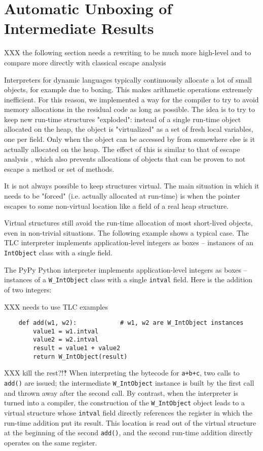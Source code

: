 \section{Automatic Unboxing of Intermediate Results}
\label{sec:virtuals}

XXX the following section needs a rewriting to be much more high-level and to
compare more directly with classical escape analysis

Interpreters for dynamic languages typically continuously allocate a lot of small
objects, for example due to boxing. This makes arithmetic operations extremely
inefficient. For this reason, we
implemented a way for the compiler to try to avoid memory allocations in the
residual code as long as possible. The idea is to try to keep new
run-time structures "exploded": instead of a single run-time object allocated on
the heap, the object is "virtualized" as a set
of fresh local variables, one per field. Only when the object can be accessed by from
somewhere else is it actually allocated on the heap. The effect of this is similar to that of
escape analysis \cite{XXX}, which also prevents allocations of objects that can
be proven to not escape a method or set of methods.

It is not always possible to keep structures virtual.  The main
situation in which it needs to be "forced" (i.e. actually allocated at
run-time) is when the pointer escapes to some non-virtual location like
a field of a real heap structure.

Virtual structures still avoid the run-time allocation of most
short-lived objects, even in non-trivial situations.  The following
example shows a typical case.  The TLC interpreter implements application-level
integers as boxes – instances of an \texttt{IntObject} class with a single
field.


The PyPy Python interpreter
implements application-level integers as boxes – instances of a
\texttt{W\_IntObject} class with a single \texttt{intval} field.  Here is the
addition of two integers:

XXX needs to use TLC examples
\begin{verbatim}
    def add(w1, w2):            # w1, w2 are W_IntObject instances
        value1 = w1.intval
        value2 = w2.intval
        result = value1 + value2
        return W_IntObject(result)
\end{verbatim}

XXX kill the rest?!‽
When interpreting the bytecode for \texttt{a+b+c}, two calls to \texttt{add()} are
issued; the intermediate \texttt{W\_IntObject} instance is built by the first
call and thrown away after the second call.  By contrast, when the
interpreter is turned into a compiler, the construction of the
\texttt{W\_IntObject} object leads to a virtual structure whose \texttt{intval}
field directly references the register in which the run-time addition
put its result.  This location is read out of the virtual structure at
the beginning of the second \texttt{add()}, and the second run-time addition
directly operates on the same register.

